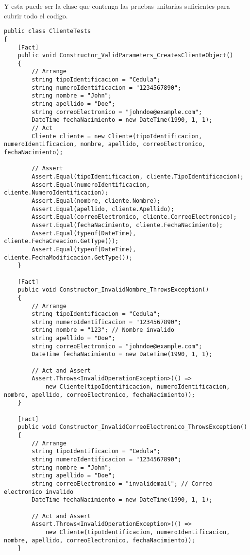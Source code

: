 \documentclass[executivepaper]{article}
\begin{document}
Y esta puede ser la clase que contenga las pruebas unitarias suficientes para cubrir todo el codigo.

\begin{lstlisting}
public class ClienteTests
{
    [Fact]
    public void Constructor_ValidParameters_CreatesClienteObject()
    {
        // Arrange
        string tipoIdentificacion = "Cedula";
        string numeroIdentificacion = "1234567890";
        string nombre = "John";
        string apellido = "Doe";
        string correoElectronico = "johndoe@example.com";
        DateTime fechaNacimiento = new DateTime(1990, 1, 1);
        // Act
        Cliente cliente = new Cliente(tipoIdentificacion, numeroIdentificacion, nombre, apellido, correoElectronico, fechaNacimiento);

        // Assert
        Assert.Equal(tipoIdentificacion, cliente.TipoIdentificacion);
        Assert.Equal(numeroIdentificacion, cliente.NumeroIdentificacion);
        Assert.Equal(nombre, cliente.Nombre);
        Assert.Equal(apellido, cliente.Apellido);
        Assert.Equal(correoElectronico, cliente.CorreoElectronico);
        Assert.Equal(fechaNacimiento, cliente.FechaNacimiento);
        Assert.Equal(typeof(DateTime), cliente.FechaCreacion.GetType());
        Assert.Equal(typeof(DateTime), cliente.FechaModificacion.GetType());
    }

    [Fact]
    public void Constructor_InvalidNombre_ThrowsException()
    {
        // Arrange
        string tipoIdentificacion = "Cedula";
        string numeroIdentificacion = "1234567890";
        string nombre = "123"; // Nombre invalido
        string apellido = "Doe";
        string correoElectronico = "johndoe@example.com";
        DateTime fechaNacimiento = new DateTime(1990, 1, 1);

        // Act and Assert
        Assert.Throws<InvalidOperationException>(() =>
            new Cliente(tipoIdentificacion, numeroIdentificacion, nombre, apellido, correoElectronico, fechaNacimiento));
    }

    [Fact]
    public void Constructor_InvalidCorreoElectronico_ThrowsException()
    {
        // Arrange
        string tipoIdentificacion = "Cedula";
        string numeroIdentificacion = "1234567890";
        string nombre = "John";
        string apellido = "Doe";
        string correoElectronico = "invalidemail"; // Correo electronico invalido
        DateTime fechaNacimiento = new DateTime(1990, 1, 1);

        // Act and Assert
        Assert.Throws<InvalidOperationException>(() =>
            new Cliente(tipoIdentificacion, numeroIdentificacion, nombre, apellido, correoElectronico, fechaNacimiento));
    }


\end{lstlisting}
\end{document}
